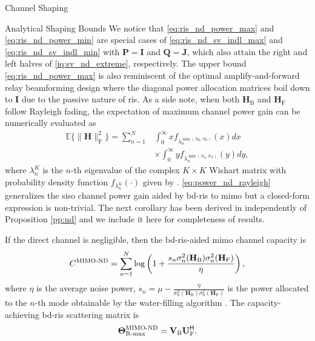 \documentclass[journal]{IEEEtran}
\begin{document}
\begin{section}{Channel Shaping}
\begin{subsection}{Analytical Shaping Bounds}
		We notice that \eqref{eq:ris_nd_power_max} and \eqref{eq:ris_nd_power_min} are special cases of \eqref{eq:ris_nd_sv_indl_max} and \eqref{eq:ris_nd_sv_indl_min} with $\mathbf{P} = \mathbf{I}$ and $\mathbf{Q} = \mathbf{J}$, which also attain the right and left halves of \eqref{iq:sv_nd_extreme}, respectively.
		The upper bound \eqref{eq:ris_nd_power_max} is also reminiscent of the optimal amplify-and-forward relay beamforming design \cite[(16), (17)]{Rong2009a} where the diagonal power allocation matrices boil down to $\mathbf{I}$ due to the passive nature of \gls{ris}.
		As a side note, when both $\mathbf{H}_\mathrm{B}$ and $\mathbf{H}_\mathrm{F}$ follow Rayleigh fading, the expectation of maximum channel power gain can be numerically evaluated as
		\begin{equation}
			\label{eq:power_nd_rayleigh}
			\begin{split}
				\mathbb{E}\bigl\{ \lVert \mathbf{H} \rVert _ \mathrm{F}^2 \bigr\} = \sum_{n=1}^N
				& \int_0^\infty x f_{\lambda_n^{\min(N_\mathrm{R},N_\mathrm{S})}}(x) d x         \\
				& \times \int_0^\infty y f_{\lambda_n^{\min(N_\mathrm{S},N_\mathrm{T})}}(y) d y,
			\end{split}
		\end{equation}
		where $\lambda_n^{K}$ is the $n$-th eigenvalue of the complex $K \times K$ Wishart matrix with probability density function $f_{\lambda_n^{K}}(\cdot)$ given by \cite[(51)]{Zanella2009}.
		\eqref{eq:power_nd_rayleigh} generalizes the \gls{siso} channel power gain aided by \gls{bd}-\gls{ris} \cite[(58)]{Shen2020a} to \gls{mimo} but a closed-form expression is non-trivial.
		The next corollary has been derived in \cite{Bartoli2023} independently of Proposition \ref{pp:nd} and we include it here for completeness of results.
		\begin{corollary}
			\label{co:nd_capacity_snr_general}
			If the direct channel is negligible, then the \gls{bd}-\gls{ris}-aided \gls{mimo} channel capacity is
			\begin{equation}
				\label{eq:capacity_nd}
				C^\textnormal{MIMO-ND} = \sum_{n=1}^N \log \left(1 + \frac{s_n \sigma_n^2(\mathbf{H}_\mathrm{B}) \sigma_n^2(\mathbf{H}_\mathrm{F})}{\eta}\right),
			\end{equation}
			where $\eta$ is the average noise power, $s_n = \mu - \frac{\eta}{\sigma_n^2(\mathbf{H}_\mathrm{B}) \sigma_n^2(\mathbf{H}_\mathrm{F})}$ is the power allocated to the $n$-th mode obtainable by the water-filling algorithm \cite{Clerckx2013}.
			The capacity-achieving \gls{bd}-\gls{ris} scattering matrix is
			\begin{equation}
				\label{eq:ris_nd_rate_max}
				\mathbf{\Theta}_\textnormal{R-max}^\textnormal{MIMO-ND} = \mathbf{V}_\mathrm{B} \mathbf{U}_\mathrm{F}^\mathsf{H}.
			\end{equation}
		\end{corollary}


\end{subsection}
\end{section}
\end{document}
